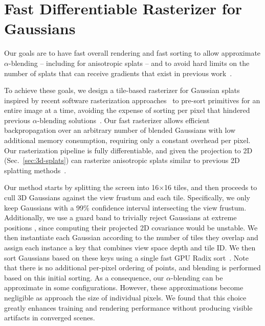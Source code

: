 \section{Fast Differentiable Rasterizer for Gaussians}
\label{sec:tile-raster}







Our goals are to have fast overall rendering and fast sorting to allow approximate $\alpha$-blending -- including for anisotropic splats -- and to avoid hard limits on the number of splats that can receive gradients that exist in previous work~\cite{Lassner_2021_CVPR}.

To achieve these goals, we design a tile-based rasterizer for Gaussian splats inspired by recent software rasterization approaches~\cite{Lassner_2021_CVPR} to pre-sort primitives for an entire image at a time, avoiding the expense of sorting per pixel that hindered previous $\alpha$-blending solutions~\cite{kopanas21,kopanas22}. Our fast rasterizer allows efficient backpropagation over an arbitrary number of blended Gaussians with low additional memory consumption, requiring only a constant overhead per pixel. 
Our rasterization pipeline is fully differentiable, and given the projection to 2D (Sec.~\ref{sec:3d-splats}) can rasterize anisotropic splats similar to previous 2D splatting methods~\cite{kopanas21}.

Our method starts by splitting the screen into 16$\times$16 tiles, and then proceeds to cull 3D Gaussians against the view frustum and each tile. 
Specifically, we only keep Gaussians with a 99\% confidence interval intersecting the view frustum. 
Additionally, we use a guard band to trivially reject Gaussians at extreme positions , since computing their projected 2D covariance would be unstable.
We then instantiate each Gaussian according to the number of tiles they overlap and assign each instance a key that combines view space depth and tile ID. We then sort Gaussians based on these keys using a single fast GPU Radix sort~\cite{merrill2010revisiting}.
Note that there is no additional per-pixel ordering of points, and blending is performed based on this initial sorting.  As a consequence, our $\alpha$-blending can be approximate in some configurations. %
However, these approximations become negligible as  approach the size of individual pixels. 
We found that this choice greatly enhances training and rendering performance without producing visible artifacts in converged scenes. 

